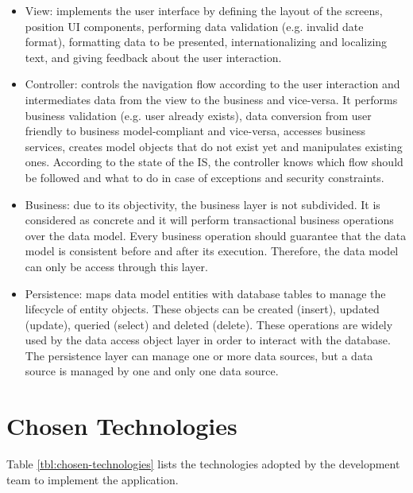 \documentclass[10pt,a4paper]{report}
\begin{document}
\begin{itemize}
\item View: implements the user interface by defining the layout of the screens, position UI components, performing data validation (e.g. invalid date format), formatting data to be presented, internationalizing and localizing text, and giving feedback about the user interaction.
\item Controller: controls the navigation flow according to the user interaction and intermediates data from the view to the business and vice-versa. It performs business validation (e.g. user already exists), data conversion from user friendly to business model-compliant and vice-versa, accesses business services, creates model objects that do not exist yet and manipulates existing ones. According to the state of the IS, the controller knows which flow should be followed and what to do in case of exceptions and security constraints.
\item Business: due to its objectivity, the business layer is not subdivided. It is considered as concrete and it will perform transactional business operations over the data model. Every business operation should guarantee that the data model is consistent before and after its execution. Therefore, the data model can only be access through this layer.
\item Persistence: maps data model entities with database tables to manage the lifecycle of entity objects. These objects can be created (insert), updated (update), queried (select) and deleted (delete). These operations are widely used by the data access object layer in order to interact with the database. The persistence layer can manage one or more data sources, but a data source is managed by one and only one data source.
\end{itemize}

\section{Chosen Technologies}

Table \ref{tbl:chosen-technologies} lists the technologies adopted by the development team to implement the application.
\end{document}
